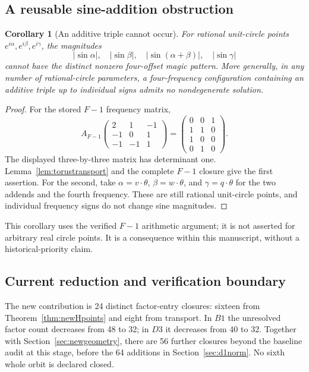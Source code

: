 \documentclass[11pt,letterpaper]{article}
\newtheorem{corollary}[theorem]{Corollary}
\theoremstyle{definition}\newtheorem{definition}[theorem]{Definition}
\theoremstyle{remark}\newtheorem{remark}[theorem]{Remark}
\begin{document}
\subsection{A reusable sine-addition obstruction}
\begin{corollary}[An additive triple cannot occur]\label{cor:additivetriple}
For rational unit-circle points $e^{i\alpha},e^{i\beta},e^{i\gamma}$, the magnitudes
\[
 |\sin\alpha|,\quad|\sin\beta|,\quad|\sin(\alpha+\beta)|,\quad|\sin\gamma|
\]
cannot have the distinct nonzero four-offset magic pattern. More generally, in any number of rational-circle parameters, a four-frequency configuration containing an additive triple up to individual signs admits no nondegenerate solution.
\end{corollary}
\begin{proof}
For the stored $F{-}1$ frequency matrix,
\[
 A_{F{-}1}\begin{pmatrix}2&1&-1\\-1&0&1\\-1&-1&1\end{pmatrix}
 =\begin{pmatrix}0&0&1\\1&1&0\\1&0&0\\0&1&0\end{pmatrix}.
\]
The displayed three-by-three matrix has determinant one. Lemma~\ref{lem:torustransport} and the complete $F{-}1$ closure give the first assertion. For the second, take $\alpha=v\cdot\theta$, $\beta=w\cdot\theta$, and $\gamma=q\cdot\theta$ for the two addends and the fourth frequency. These are still rational unit-circle points, and individual frequency signs do not change sine magnitudes.
\end{proof}
This corollary uses the verified $F{-}1$ arithmetic argument; it is not asserted for arbitrary real circle points. It is a consequence within this manuscript, without a historical-priority claim.

\subsection{Current reduction and verification boundary}
The new contribution is 24 distinct factor-entry closures: sixteen from Theorem~\ref{thm:newHpoints} and eight from transport. In $B1$ the unresolved factor count decreases from 48 to 32; in $D3$ it decreases from 40 to 32. Together with Section~\ref{sec:newgeometry}, there are 56 further closures beyond the baseline audit at this stage, before the 64 additions in Section~\ref{sec:d1norm}. No sixth whole orbit is declared closed.
\end{document}
